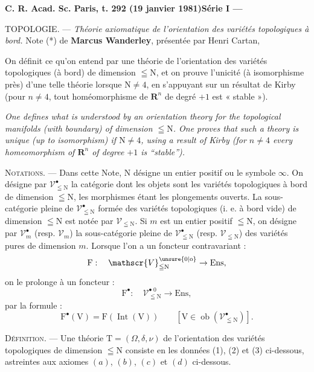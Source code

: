 \textbf{C. R. Acad. Sc. Paris, t. 292 (19 janvier 1981)\hfill Série I --- }

TOPOLOGIE. --- \textit{Théorie axiomatique de l'orientation des variétés topologiques à bord.} Note (*) de \textbf{Marcus Wanderley}, présentée par Henri Cartan,

On définit ce qu'on entend par une théorie de l'orientation des variétés topologiques (à bord) de dimension $\leqq\mathrm{N}$, et on prouve l'unicité (à isomorphisme près) d'une telle théorie lorsque $\mathrm{N}\ne4$, en s'appuyant sur un résultat de Kirby (pour $n\ne4$, tout homéomorphisme de $\mathbf{R}^n$ de degré $+1$ est « stable »).

\textit{One defines what is understood by an orientation theory for the topological manifolds (with boundary) of dimension $\leqq\mathrm{N}$. One proves that such a theory is unique (up to isomorphism) if $\mathrm{N}\ne4$, using a result of Kirby (for $n\ne4$ every homeomorphism of $\mathbf{R}^n$ of degree $+1$ is ``stable'').}

\textsc{Notations}. --- Dans cette Note, $\mathrm{N}$ désigne un entier positif ou le symbole $\infty$. On désigne par $\mathscr{V}^{\bullet}_{\leqq\mathrm{N}}$ la catégorie dont les objets sont les variétés topologiques à bord de dimension $\leqq\mathrm{N}$, les morphismes étant les plongements ouverts. La sous-catégorie pleine de $\mathscr{V}^{\bullet}_{\leqq\mathrm{N}}$ formée des variétés topologiques (i. e. à bord vide) de dimension $\leqq\mathrm{N}$ est notée par $\mathscr{V}_{\leqq\mathrm{N}}$. Si $m$ est un entier positif $\leqq\mathrm{N}$, on désigne par $\mathscr{V}^{\bullet}_m$ (resp. $\mathscr{V}_m$) la sous-catégorie pleine de $\mathscr{V}^{\bullet}_{\leqq\mathrm{N}}$ (resp. $\mathscr{V}_{\leqq\mathrm{N}}$) des variétés pures de dimension $m$. Lorsque l'on a un foncteur contravariant :
\[
\mathrm{F}:\quad\mathscr{V}^{\unsure{0|\mathrm{o}}}_{\leqq\mathrm{N}}\to\mathrm{Ens},
\]
on le prolonge à un foncteur :
\[
\mathrm{F}^{\bullet}:\quad\mathscr{V}^{\bullet\;0}_{\leqq\mathrm{N}}\to\mathrm{Ens},
\]
par la formule :
\[
\mathrm{F}^{\bullet}(\mathrm{V})=\mathrm{F}(\operatorname{Int}(\mathrm{V}))\qquad [\mathrm{V}\in\operatorname{ob}(\mathscr{V}^{\bullet}_{\leqq\mathrm{N}})].
\]

\textsc{Définition}. --- Une théorie $\mathrm{T}=(\Omega,\delta,\nu)$ de l'orientation des variétés topologiques de dimension $\leqq\mathrm{N}$ consiste en les données (1), (2) et (3) ci-dessous, astreintes aux axiomes $(a)$, $(b)$, $(c)$ et $(d)$ ci-dessous.

